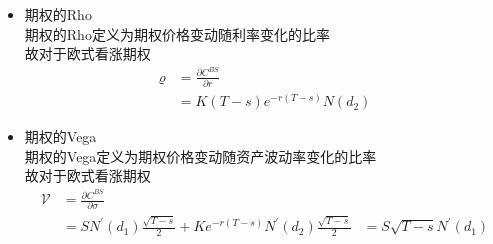 \documentclass{article}
\begin{document}
\begin{itemize}
	\item 期权的Rho\\
	期权的Rho定义为期权价格变动随利率变化的比率\\
	故对于欧式看涨期权\\
	\begin{align}
	\nonumber \varrho & = \frac{\partial C^{BS}}{\partial r}\\
	\nonumber  & = K(T-s)e^{-r(T-s)}N(d_{2}) 
	\end{align}
	\item 期权的Vega\\
	期权的Vega定义为期权价格变动随资产波动率变化的比率\\
	故对于欧式看涨期权\\
	\begin{align}
	\nonumber \mathcal{V} & = \frac{\partial C^{BS}}{\partial \sigma}\\
	\nonumber  & = SN^{'}(d_{1})\frac{\sqrt{T-s}}{2} + Ke^{-r(T-s)}N^{'}(d_{2}) \frac{\sqrt{T-s}}{2}
	\nonumber  & =S\sqrt{T-s}N^{'}(d_{1})
	\end{align}
\end{itemize}
\end{document}
